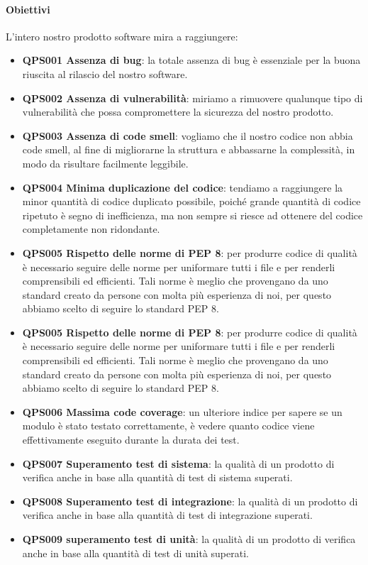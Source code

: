 		\paragraph*{Obiettivi} 	
		L'intero nostro prodotto software mira a raggiungere:
		\begin{itemize}
			\item \textbf{QPS001 Assenza di bug}: la totale assenza di bug è essenziale per la buona riuscita al rilascio del nostro software.
			\item \textbf{QPS002 Assenza di vulnerabilità}: miriamo a rimuovere qualunque tipo di vulnerabilità che possa compromettere la sicurezza del nostro prodotto.
			\item \textbf{QPS003 Assenza di code smell}: vogliamo che il nostro codice non abbia code smell, al fine di migliorarne la struttura e abbassarne la complessità, in modo da risultare facilmente leggibile.
			\item \textbf{QPS004 Minima duplicazione del codice}: tendiamo a raggiungere la minor quantità di codice duplicato possibile, poiché grande quantità di codice ripetuto è segno di inefficienza, ma non sempre si riesce ad ottenere del codice completamente non ridondante.
            \item \textbf{QPS005 Rispetto delle norme di PEP 8}: per produrre codice di qualità è necessario seguire delle norme per uniformare tutti i file e per renderli comprensibili ed efficienti. Tali norme è meglio che provengano da uno standard creato da persone con molta più esperienza di noi, per questo abbiamo scelto di seguire lo standard PEP 8.
            \item \textbf{QPS005 Rispetto delle norme di PEP 8}: per produrre codice di qualità è necessario seguire delle norme per uniformare tutti i file e per renderli comprensibili ed efficienti. Tali norme è meglio che provengano da uno standard creato da persone con molta più esperienza di noi, per questo abbiamo scelto di seguire lo standard PEP 8.
            \item \textbf{QPS006 Massima code coverage}: un ulteriore indice per sapere se un modulo è stato testato correttamente, è vedere quanto codice viene effettivamente eseguito durante la durata dei test.
            \item \textbf{QPS007 Superamento test di sistema}: la qualità di un prodotto di verifica anche in base alla quantità di test di sistema superati.
            \item \textbf{QPS008 Superamento test di integrazione}: la qualità di un prodotto di verifica anche in base alla quantità di test di integrazione superati.
            \item \textbf{QPS009 superamento test di unità}: la qualità di un prodotto di verifica anche in base alla quantità di test di unità superati.
		\end{itemize}


